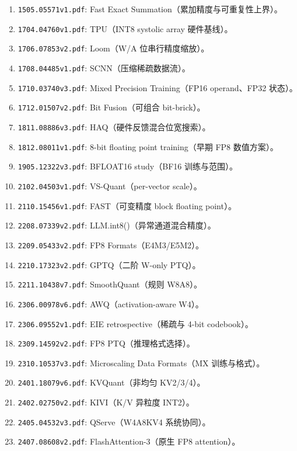 \begin{enumerate}[label=\textbf{L\arabic*.},leftmargin=3.4em]
  \item \texttt{1505.05571v1.pdf}: Fast Exact Summation（累加精度与可重复性上界）。
  \item \texttt{1704.04760v1.pdf}: TPU（INT8 systolic array 硬件基线）。
  \item \texttt{1706.07853v2.pdf}: Loom（W/A 位串行精度缩放）。
  \item \texttt{1708.04485v1.pdf}: SCNN（压缩稀疏数据流）。
  \item \texttt{1710.03740v3.pdf}: Mixed Precision Training（FP16 operand、FP32 状态）。
  \item \texttt{1712.01507v2.pdf}: Bit Fusion（可组合 bit-brick）。
  \item \texttt{1811.08886v3.pdf}: HAQ（硬件反馈混合位宽搜索）。
  \item \texttt{1812.08011v1.pdf}: 8-bit floating point training（早期 FP8 数值方案）。
  \item \texttt{1905.12322v3.pdf}: BFLOAT16 study（BF16 训练与范围）。
  \item \texttt{2102.04503v1.pdf}: VS-Quant（per-vector scale）。
  \item \texttt{2110.15456v1.pdf}: FAST（可变精度 block floating point）。
  \item \texttt{2208.07339v2.pdf}: LLM.int8()（异常通道混合精度）。
  \item \texttt{2209.05433v2.pdf}: FP8 Formats（E4M3/E5M2）。
  \item \texttt{2210.17323v2.pdf}: GPTQ（二阶 W-only PTQ）。
  \item \texttt{2211.10438v7.pdf}: SmoothQuant（规则 W8A8）。
  \item \texttt{2306.00978v6.pdf}: AWQ（activation-aware W4）。
  \item \texttt{2306.09552v1.pdf}: EIE retrospective（稀疏与 4-bit codebook）。
  \item \texttt{2309.14592v2.pdf}: FP8 PTQ（推理格式选择）。
  \item \texttt{2310.10537v3.pdf}: Microscaling Data Formats（MX 训练与格式）。
  \item \texttt{2401.18079v6.pdf}: KVQuant（非均匀 KV2/3/4）。
  \item \texttt{2402.02750v2.pdf}: KIVI（K/V 异粒度 INT2）。
  \item \texttt{2405.04532v3.pdf}: QServe（W4A8KV4 系统协同）。
  \item \texttt{2407.08608v2.pdf}: FlashAttention-3（原生 FP8 attention）。

\end{enumerate}

